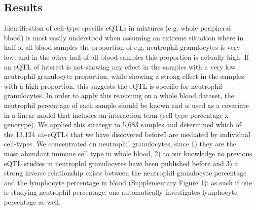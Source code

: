   \subsection{Results}
  Identification of cell-type specific eQTLs in mixtures (e.g. whole peripheral blood) is most easily 
  understood when assuming an extreme situation where in half of all blood samples the proportion of 
  e.g. neutrophil granulocytes is very low, and in the other half of all blood samples this proportion 
  is actually high. If an eQTL of interest is not showing any effect in the samples with a very low 
  neutrophil granulocyte proportion, while showing a strong effect in the samples with a high proportion, 
  this suggests the eQTL is specific for neutrophil granulocytes. In order to apply this reasoning on 
  a whole blood dataset, the neutrophil percentage of each sample should be known and is used as a 
  covariate in a linear model that includes an interaction term (cell type percentage x genotype). 
  We applied this strategy to 5,683 samples and determined which of the 13,124 \emph{cis}-eQTLs that we have 
  discovered before5 are mediated by individual cell-types. We concentrated on neutrophil granulocytes, 
  since 1) they are the most abundant immune cell type in whole blood, 2) to our knowledge no previous 
  eQTL studies in neutrophil granulocytes have been published before and 3) a strong inverse 
  relationship exists between the neutrophil granulocyte percentage and the lymphocyte percentage in 
  blood (Supplementary Figure 1): as such if one is studying neutrophil percentage, one automatically 
  investigates lymphocyte percentage as well.

